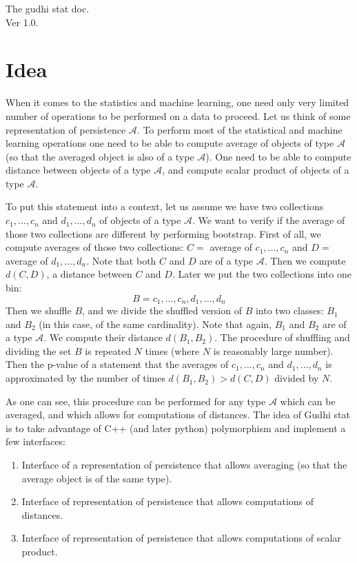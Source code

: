 \documentclass[11pt]{article}
\begin{document}
\begin{center}
\Huge{The gudhi stat doc.\\
Ver 1.0.}
\end{center}


\section{Idea}

When it comes to the statistics and machine learning, one need only very limited number of operations to be performed on a data to proceed. Let us think of some representation of persistence $\mathcal{A}$. To perform most of the statistical and machine learning operations one need to be able to compute average of objects of type $\mathcal{A}$ (so that the averaged object is also of a type $\mathcal{A}$). One need to be able to compute distance between objects of a type $\mathcal{A}$, and compute scalar product of objects of a type $\mathcal{A}$.

To put this statement into a context, let us assume we have two collections $c_1,...,c_n$ and $d_1,...,d_n$ of objects of a type $\mathcal{A}$. We want to verify if the average of those two collections are different by performing bootstrap.
First of all, we compute averages of those two collections: $C =$ average of $c_1,...,c_n$ and $D =$ average of $d_1,...,d_n$. Note that both $C$ and $D$ are of a type $\mathcal{A}$. Then we compute $d(C,D)$, a distance between $C$ and $D$.
Later we put the two collections into one bin:\\
\[B = { c_1,...,c_n,d_1,...,d_n }\]
Then we shuffle $B$, and we divide the shuffled version of $B$ into two classes: $B_1$ and $B_2$ (in this case, of the same cardinality). Note that again, $B_1$ and $B_2$ are of a type $\mathcal{A}$. We compute their distance $d(B_1,B_2)$. The procedure of shuffling and dividing the set $B$ is repeated $N$ times (where $N$ is reasonably large number).
Then the p-value of a statement that the averages of  $c_1,...,c_n$ and $d_1,...,d_n$ is approximated by the number of times $d(B_1,B_2) > d(C,D)$ divided by $N$.

As one can see, this procedure can be performed for any type $\mathcal{A}$ which can be averaged, and which allows for computations of distances. The idea of Gudhi stat is to take advantage of C++ (and later python) polymorphism and implement a few interfaces:
\begin{enumerate}
\item Interface of a representation of persistence that allows averaging (so that the average object is of the same type).
\item Interface of representation of persistence that allows computations of distances.
\item Interface of representation of persistence that allows computations of scalar product.
\end{enumerate}
\end{document}
